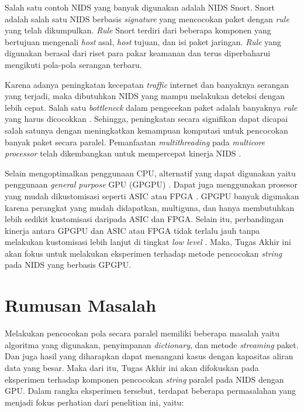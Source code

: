   Salah satu contoh NIDS yang banyak digunakan adalah NIDS Snort. Snort adalah salah satu NIDS berbasis \emph{signature} yang mencocokan paket dengan \emph{rule} yang telah dikumpulkan. \emph{Rule} Snort terdiri dari beberapa komponen yang bertujuan mengenali \emph{host} asal, \emph{host} tujuan, dan isi paket jaringan. \emph{Rule} yang digunakan berasal dari riset para pakar keamanan dan terus diperbaharui mengikuti pola-pola serangan terbaru.

  Karena adanya peningkatan kecepatan \emph{traffic} internet dan banyaknya serangan yang terjadi, maka dibutuhkan NIDS yang mampu melakukan deteksi dengan lebih cepat. Salah satu \emph{bottleneck} dalam pengecekan paket adalah banyaknya \emph{rule} yang harus dicocokkan \citep{pcre2007}. Sehingga, peningkatan secara signifikan dapat dicapai salah satunya dengan meningkatkan kemampuan komputasi untuk pencocokan banyak paket secara paralel. Pemanfaatan \emph{multithreading} pada \emph{multicore processor} telah dikembangkan untuk mempercepat kinerja NIDS \citep{multi2004}.

  Selain mengoptimalkan penggunaan CPU, alternatif yang dapat digunakan yaitu penggunaan \emph{general purpose} GPU (GPGPU) \citep{4482891}. Dapat juga menggunakan prosesor yang mudah dikustomisasi seperti ASIC atau FPGA \citep{fpga2008}. GPGPU banyak digunakan karena perangkat yang mudah didapatkan, multiguna, dan hanya membutuhkan lebih sedikit kustomisasi daripada ASIC dan FPGA. Selain itu, perbandingan kinerja antara GPGPU dan ASIC atau FPGA tidak terlalu jauh tanpa melakukan kustomisasi lebih lanjut di tingkat \emph{low level} \citep{gnort2008}. Maka, Tugas Akhir ini akan fokus untuk melakukan eksperimen terhadap metode pencocokan \emph{string} pada NIDS yang berbasis GPGPU.

\section{Rumusan Masalah}

  Melakukan pencocokan pola secara paralel memiliki beberapa masalah yaitu algoritma yang digunakan, penyimpanan \emph{dictionary}, dan metode \emph{streaming} paket. Dan juga hasil yang diharapkan dapat menangani kasus dengan kapasitas aliran data yang besar. Maka dari itu, Tugas Akhir ini akan difokuskan pada eksperimen terhadap komponen pencocokan \emph{string} paralel pada NIDS dengan GPU. Dalam rangka eksperimen tersebut, terdapat beberapa permasalahan yang menjadi fokus perhatian dari penelitian ini, yaitu: 

